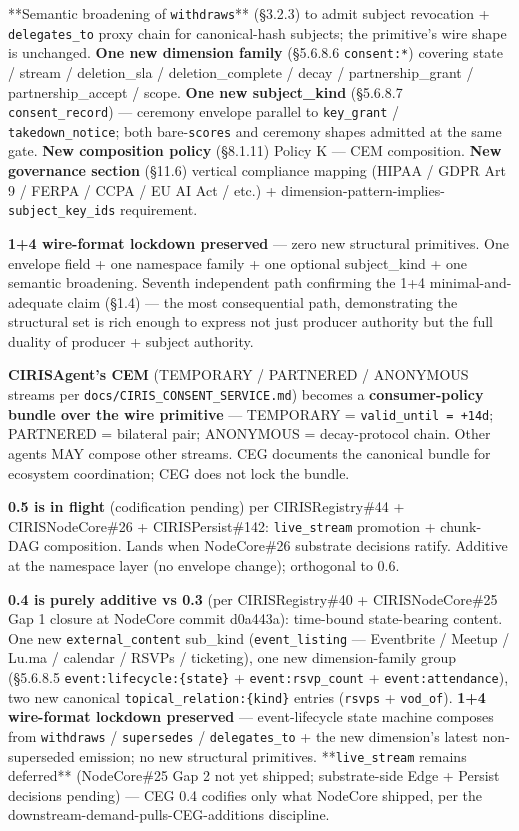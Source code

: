 \documentclass[10pt]{article}
\begin{document}
**Semantic broadening of \texttt{withdraws}** (§3.2.3) to admit subject revocation + \texttt{delegates\_to} proxy chain for canonical-hash subjects; the primitive's wire shape is unchanged. \textbf{One new dimension family} (§5.6.8.6 \texttt{consent:*}) covering state / stream / deletion\_sla / deletion\_complete / decay / partnership\_grant / partnership\_accept / scope. \textbf{One new subject\_kind} (§5.6.8.7 \texttt{consent\_record}) — ceremony envelope parallel to \texttt{key\_grant} / \texttt{takedown\_notice}; both bare-\texttt{scores} and ceremony shapes admitted at the same gate. \textbf{New composition policy} (§8.1.11) Policy K — CEM composition. \textbf{New governance section} (§11.6) vertical compliance mapping (HIPAA / GDPR Art 9 / FERPA / CCPA / EU AI Act / etc.) + dimension-pattern-implies-\texttt{subject\_key\_ids} requirement.


\textbf{1+4 wire-format lockdown preserved} — zero new structural primitives. One envelope field + one namespace family + one optional subject\_kind + one semantic broadening. Seventh independent path confirming the 1+4 minimal-and-adequate claim (§1.4) — the most consequential path, demonstrating the structural set is rich enough to express not just producer authority but the full duality of producer + subject authority.


\textbf{CIRISAgent's CEM} (TEMPORARY / PARTNERED / ANONYMOUS streams per \texttt{docs/CIRIS\_CONSENT\_SERVICE.md}) becomes a \textbf{consumer-policy bundle over the wire primitive} — TEMPORARY = \texttt{valid\_until = +14d}; PARTNERED = bilateral pair; ANONYMOUS = decay-protocol chain. Other agents MAY compose other streams. CEG documents the canonical bundle for ecosystem coordination; CEG does not lock the bundle.


\textbf{0.5 is in flight} (codification pending) per CIRISRegistry\#44 + CIRISNodeCore\#26 + CIRISPersist\#142: \texttt{live\_stream} promotion + chunk-DAG composition. Lands when NodeCore\#26 substrate decisions ratify. Additive at the namespace layer (no envelope change); orthogonal to 0.6.


\textbf{0.4 is purely additive vs 0.3} (per CIRISRegistry\#40 + CIRISNodeCore\#25 Gap 1 closure at NodeCore commit d0a443a): time-bound state-bearing content. One new \texttt{external\_content} sub\_kind (\texttt{event\_listing} — Eventbrite / Meetup / Lu.ma / calendar / RSVPs / ticketing), one new dimension-family group (§5.6.8.5 \texttt{event:lifecycle:\{state\}} + \texttt{event:rsvp\_count} + \texttt{event:attendance}), two new canonical \texttt{topical\_relation:\{kind\}} entries (\texttt{rsvps} + \texttt{vod\_of}). \textbf{1+4 wire-format lockdown preserved} — event-lifecycle state machine composes from \texttt{withdraws} / \texttt{supersedes} / \texttt{delegates\_to} + the new dimension's latest non-superseded emission; no new structural primitives. **\texttt{live\_stream} remains deferred** (NodeCore\#25 Gap 2 not yet shipped; substrate-side Edge + Persist decisions pending) — CEG 0.4 codifies only what NodeCore shipped, per the downstream-demand-pulls-CEG-additions discipline.
\end{document}
